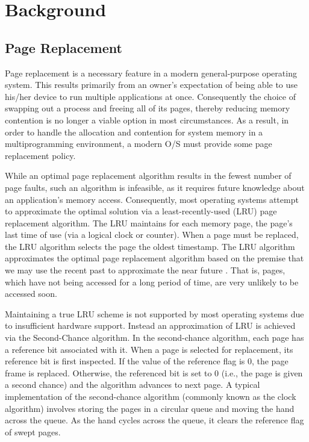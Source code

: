 \documentclass[10pt,a4paper,twocolumn]{article}
\begin{document}
\section{Background}

\subsection{Page Replacement}
Page replacement is a necessary feature in a modern general-purpose
operating system. This results primarily from an owner's expectation of being able to use his/her
device to run multiple applications at once. Consequently the choice of swapping out a process and
freeing all of its pages, thereby reducing memory contention is no longer a viable option in most
circumstances. As a result, in order to handle the allocation and contention for system memory in a
multiprogramming environment, a modern O/S must provide some page replacement policy. 

While an optimal page replacement algorithm results in the fewest number of page faults, such an
algorithm is infeasible, as it requires future knowledge about an application's memory access.
Consequently, most operating systems attempt to approximate the optimal solution via a
least-recently-used (LRU) page replacement algorithm.  The LRU maintains for each memory page, the
page's last time of use (via a logical clock or counter).  When a page must be replaced, the LRU
algorithm selects the page the oldest timestamp. The LRU algorithm approximates the optimal page
replacement algorithm based on the premise that we may use the recent past to approximate the near
future \cite{SILBER}. That is, pages, which have not being accessed for a long
period of time, are very unlikely to be accessed soon. 

Maintaining a true LRU scheme is not supported by most operating systems due to insufficient
hardware support. Instead an approximation of LRU is achieved via the Second-Chance algorithm. In
the second-chance algorithm, each page has a reference bit associated with it. When a page is
selected for replacement, its reference bit is first inspected. If the value of the reference flag
is 0, the page frame is replaced. Otherwise, the referenced bit is set to 0 (i.e., the page is given
a second chance) and the algorithm advances to next page. A typical implementation of the
second-chance algorithm (commonly known as the clock algorithm) involves storing the pages in a
circular queue and moving the hand across the queue. As the hand cycles across the queue, it clears
the reference flag of swept pages.
 
\end{document}
